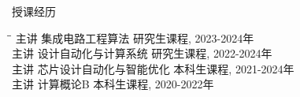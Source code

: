 \begin{rSection}{授课经历}

\begin{tabbing}
\hspace{1.5in}\= \hspace{3.4in}\= \kill
主讲 \> 集成电路工程算法 \> { 研究生课程, 2023-2024年 } \\
主讲 \> 设计自动化与计算系统 \> { 研究生课程, 2022-2024年} \\
主讲 \> 芯片设计自动化与智能优化 \> { 本科生课程, 2021-2024年 } \\
主讲 \> 计算概论B \> { 本科生课程, 2020-2022年 } \\
\end{tabbing}

\end{rSection}
